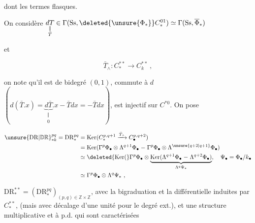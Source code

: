 dont les termes   flasques.

On considère $\underset{\substack{\Vert\\\bar T}}{dT}\in\Gamma(\mathrm{Ss},\deleted{\unsure{\Phi_*}}C^{01}_*)\simeq\Gamma(\mathrm{Ss},\overline{\Phi}_*)$

et 

\[
\bar T_\wedge:C^{**}_*\longrightarrow C^{**}_{k}\ ,
\]

on note qu'il est de bidegré $(0,1)$, commute à $d$ $(d(\bar T.x)=\underbrace{d\bar T}_{\substack{\Vert\\0}}.x-\bar T dx=-\bar Tdx)$, est injectif sur $C^{*0}$. On pose

\[
\begin{aligned}
\unsure{\mathrm{DR}|\mathbb{D}\mathbb{R}}_{*k}^{pq}=\mathrm{DR}_*^{pq}
 &=\operatorname{Ker}(C^{p,q+1}_*\xrightarrow{\bar T_\wedge}C^{p,q+2}_\bullet)\\
 &=\operatorname{Ker}(\Gamma^p\Phi_\bullet\otimes\Lambda^{q+1}\Phi_\bullet\relbar
 \Gamma^p\Phi_\bullet\otimes\Lambda^{\unsure{q+2|q+1}}\Phi_\bullet)\\
 &\simeq\deleted{\operatorname{Ker}(}\Gamma^p\Phi_\bullet\otimes
 \underbrace{\operatorname{Ker}(\Lambda^{q+1}\Phi_\bullet\relbar\Lambda^{q+2}\Phi_\bullet)}_{\Lambda^q\Psi_*},
 \quad\Psi_\bullet=\Phi_\bullet/k_\bullet\\
 &\simeq\Gamma^p\Phi_\bullet\otimes\Lambda^q\Psi_*\ ,
\end{aligned}
\]

$\mathrm{DR}_*^{**}=(\mathrm{DR}_*^{pq})_{(p,q)\in\mathbb Z\times\mathbb Z}$, avec la bigraduation et la différentielle  induites par $C_*^{**}$,  (mais avec décalage d'une unité pour le degré ext.), et une structure multiplicative  et à p.d. qui sont caractérisées

